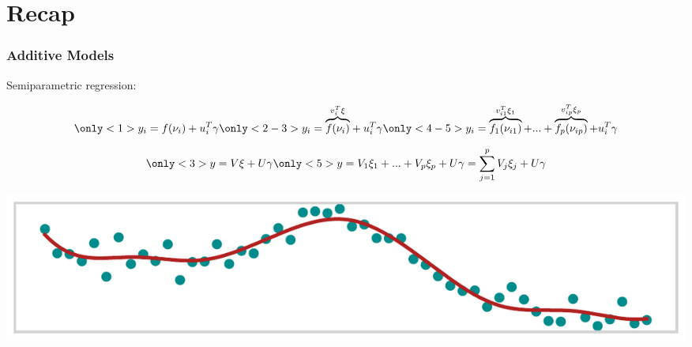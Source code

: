 \documentclass[final]{beamer}
\newcommand{\inserteqstrut}[1]{%
  \rlap{$\displaystyle#1$}%
  \phantom{\biggesteq}}
\begin{document}
\section{Recap}

\renewcommand{\biggesteq}{\overbrace{f(\nu_{i})}^{v^T_{i}\xi_1}}
\begin{frame}[b]
\frametitle{Additive Models}

Semiparametric regression:

\begin{minipage}[b][4em][b]{\textwidth}
\begin{overprint}
\begin{align*}
\only<1>{
y_i = \inserteqstrut{f(\nu_{i})} + u^T_i \gamma
}
\only<2-3>{
y_i = \inserteqstrut{\overbrace{f(\nu_{i})}^{v^T_{i}\xi}} + u^T_i \gamma
}
\only<4-5>{
y_i = \overbrace{f_1(\nu_{i1})}^{v^T_{i1}\xi_1} + ... + \overbrace{f_p(\nu_{ip})}^{v^T_{ip}\xi_p} + u^T_i \gamma
}
\end{align*}
\end{overprint}
\vspace{-2.5em}
\end{minipage}

\begin{minipage}[t][0em][t]{\textwidth}
\vspace{-0.5em}
\end{minipage}

\begin{minipage}[b][4em][b]{\textwidth}
\begin{overprint}
\begin{align*}
\only<3>{
y = V\xi + U\gamma
}
\only<5>{
y = V_1\xi_1 + ... + V_p \xi_p + U\gamma =\sum_{j=1}^p V_j\xi_j + U\gamma
}
\end{align*}
\end{overprint}
\vspace{-3em}
\end{minipage}


\begin{center}
\includegraphics[width=\textwidth]{Images/flex}
\end{center}

\end{frame}
\end{document}
